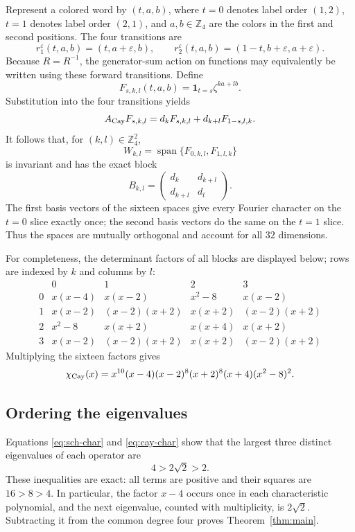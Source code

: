 \documentclass[11pt]{article}
\newcommand{\Z}{\mathbb Z}
\begin{document}
Represent a colored word by $(t,a,b)$, where $t=0$ denotes label order
$(1,2)$, $t=1$ denotes label order $(2,1)$, and $a,b\in\Z_4$ are the colors
in the first and second positions.  The four transitions are
\[
 r_1^\varepsilon(t,a,b)=(t,a+\varepsilon,b),\qquad
 r_2^\varepsilon(t,a,b)=(1-t,b+\varepsilon,a+\varepsilon).
\]
Because $R=R^{-1}$, the generator-sum action on functions may equivalently
be written using these forward transitions.  Define
\[
 F_{s,k,l}(t,a,b)=\mathbf 1_{t=s}\zeta^{ka+lb}.
\]
Substitution into the four transitions yields
\begin{equation}\label{eq:intertwine}
 A_{\rm Cay}F_{s,k,l}
   =d_kF_{s,k,l}+d_{k+l}F_{1-s,l,k}.
\end{equation}
It follows that, for $(k,l)\in\Z_4^2$,
\[
 W_{k,l}=\operatorname{span}\{F_{0,k,l},F_{1,l,k}\}
\]
is invariant and has the exact block
\[
 B_{k,l}=\begin{pmatrix}d_k&d_{k+l}\\d_{k+l}&d_l\end{pmatrix}.
\]
The first basis vectors of the sixteen spaces give every Fourier character
on the $t=0$ slice exactly once; the second basis vectors do the same on the
$t=1$ slice.  Thus the spaces are mutually orthogonal and account for all
$32$ dimensions.

For completeness, the determinant factors of all blocks are displayed
below; rows are indexed by $k$ and columns by $l$:
\[
\begin{array}{c|cccc}
 &0&1&2&3\\ \hline
0&x(x-4)&x(x-2)&x^2-8&x(x-2)\\
1&x(x-2)&(x-2)(x+2)&x(x+2)&(x-2)(x+2)\\
2&x^2-8&x(x+2)&x(x+4)&x(x+2)\\
3&x(x-2)&(x-2)(x+2)&x(x+2)&(x-2)(x+2)
\end{array}
\]
Multiplying the sixteen factors gives
\begin{equation}\label{eq:cay-char}
 \chi_{\rm Cay}(x)
 =x^{10}(x-4)(x-2)^8(x+2)^8(x+4)(x^2-8)^2.
\end{equation}

\subsection{Ordering the eigenvalues}

Equations \eqref{eq:sch-char} and \eqref{eq:cay-char} show that the largest
three distinct eigenvalues of each operator are
\[
 4>2\sqrt2>2.
\]
These inequalities are exact: all terms are positive and their squares are
$16>8>4$.  In particular, the factor $x-4$ occurs once in each
characteristic polynomial, and the next eigenvalue, counted with
multiplicity, is $2\sqrt2$.  Subtracting it from the common degree four
proves Theorem~\ref{thm:main}.
\end{document}
